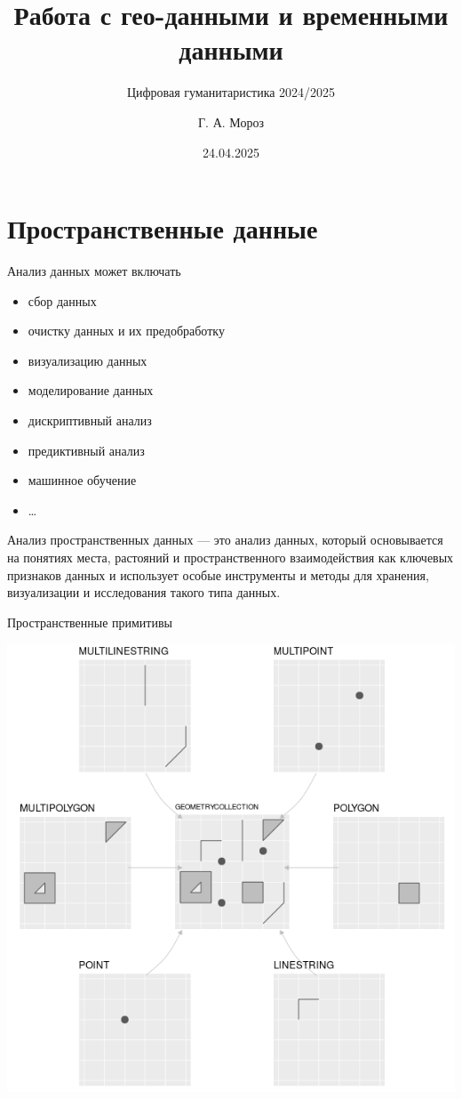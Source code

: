 \documentclass[
  ignorenonframetext,
  t]{beamer}
\title{Работа с гео-данными и временными данными}
\subtitle{Цифровая гуманитаристика 2024/2025}
\author{Г. А. Мороз}
\date{24.04.2025}
\institute{Международная лаборатория языковой конвергенции, НИУ ВШЭ}
\providecommand{\tightlist}{%
  \setlength{\itemsep}{0pt}\setlength{\parskip}{0pt}}\usepackage{longtable,booktabs,array}
\begin{document}
\frame{\titlepage}


\section{Пространственные
данные}\label{ux43fux440ux43eux441ux442ux440ux430ux43dux441ux442ux432ux435ux43dux43dux44bux435-ux434ux430ux43dux43dux44bux435}

\begin{frame}{Анализ данных может включать}
\label{ux430ux43dux430ux43bux438ux437-ux434ux430ux43dux43dux44bux445-ux43cux43eux436ux435ux442-ux432ux43aux43bux44eux447ux430ux442ux44c}
\begin{itemize}
\tightlist
\item
  сбор данных
\item
  очистку данных и их предобработку
\item
  визуализацию данных
\item
  моделирование данных
\item
  дискриптивный анализ
\item
  предиктивный анализ
\item
  машинное обучение
\item
  \ldots{}
\end{itemize}
\end{frame}

\begin{frame}{Анализ пространственных данных --- это}
\label{ux430ux43dux430ux43bux438ux437-ux43fux440ux43eux441ux442ux440ux430ux43dux441ux442ux432ux435ux43dux43dux44bux445-ux434ux430ux43dux43dux44bux445-ux44dux442ux43e}
анализ данных, который основывается на понятиях места, растояний и
пространственного взаимодействия как ключевых признаков данных и
использует особые инструменты и методы для хранения, визуализации и
исследования такого типа данных.
\end{frame}

\begin{frame}{Пространственные примитивы}
\label{ux43fux440ux43eux441ux442ux440ux430ux43dux441ux442ux432ux435ux43dux43dux44bux435-ux43fux440ux438ux43cux438ux442ux438ux432ux44b}
\begin{center}
\includegraphics[width=0.65\linewidth,height=\textheight,keepaspectratio]{images/01_geometries.png}
\end{center}
\end{frame}
\end{document}
